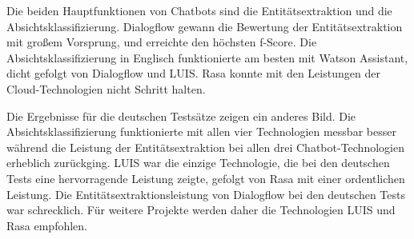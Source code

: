 Die beiden Hauptfunktionen von Chatbots sind die Entitätsextraktion und die Absichtsklassifizierung.
Dialogflow gewann die Bewertung der Entitätsextraktion mit großem Vorsprung, und erreichte den höchsten f-Score.
Die Absichtsklassifizierung in Englisch funktionierte am besten mit Watson Assistant, dicht gefolgt von Dialogflow und LUIS.
Rasa konnte mit den Leistungen der Cloud-Technologien nicht Schritt halten.

Die Ergebnisse für die deutschen Testsätze zeigen ein anderes Bild.
Die Absichtsklassifizierung funktionierte mit allen vier Technologien messbar besser während die Leistung der Entitätsextraktion bei allen drei Chatbot-Technologien erheblich zurückging.
LUIS war die einzige Technologie, die bei den deutschen Tests eine hervorragende Leistung zeigte, gefolgt von Rasa mit einer ordentlichen Leistung.
Die Entitätsextraktionsleistung von Dialogflow bei den deutschen Tests war schrecklich.
Für weitere Projekte werden daher die Technologien LUIS und Rasa empfohlen.